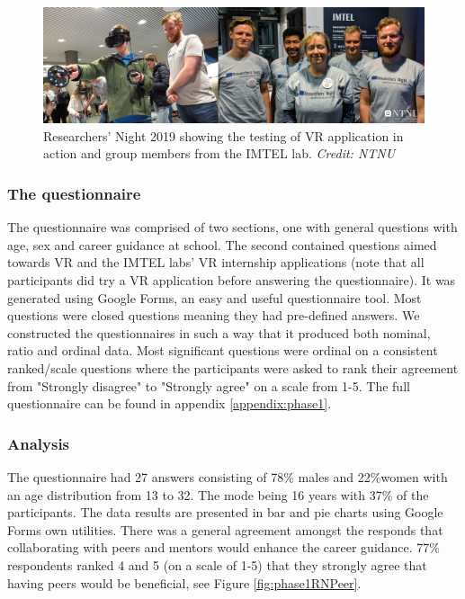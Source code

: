 \begin{figure}[!ht]
    \centering
    \captionsetup{width=.8\linewidth}
    \includegraphics[width=.9\textwidth]{./fig/phase_1/researcherNight/RN_group.jpg}
    \caption{Researchers' Night 2019 showing the testing of VR application in action and group members from the IMTEL lab. \textit{Credit: NTNU}}
    \label{fig:phase1RNGroup}
\end{figure}


\subsubsection{The questionnaire}
The questionnaire was comprised of two sections, one with general questions with age, sex and career guidance at school. The second contained questions aimed towards VR and the IMTEL labs' VR internship applications (note that all participants did try a VR application before answering the questionnaire). It was generated using Google Forms, an easy and useful questionnaire tool. Most questions were closed questions meaning they had pre-defined answers. We constructed the questionnaires in such a way that it produced both nominal, ratio and ordinal data. Most significant questions were ordinal on a consistent ranked/scale questions where the participants were asked to rank their agreement from  "Strongly disagree" to "Strongly agree" on a scale from 1-5. 
The full questionnaire can be found in appendix \ref{appendix:phase1}. 

\subsubsection{Analysis}
The questionnaire had 27 answers consisting of 78\% males and 22\%women with an age distribution from 13 to 32. The mode being 16 years with 37\% of the participants. The data results are presented in bar and pie charts using Google Forms own utilities. There was a general agreement amongst the responds that collaborating with peers and mentors would enhance the career guidance. 77\% respondents ranked 4 and 5 (on a scale of 1-5) that they strongly agree that having peers would be beneficial, see Figure \ref{fig:phase1RNPeer}.    

